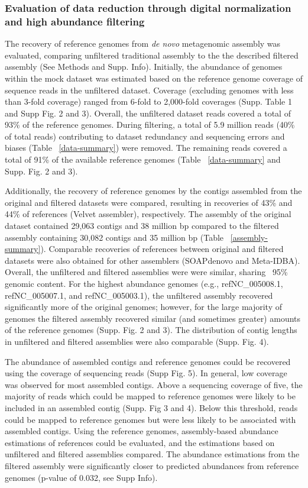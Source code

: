 \documentclass[11pt]{article} %
\begin{document}
\subsubsection{Evaluation of data reduction through digital normalization 
and high abundance filtering}

The recovery of reference genomes from {\em de novo} metagenomic assembly
was evaluated, comparing unfiltered traditional assembly to the the
described filtered assembly (See Methods and Supp. Info). Initially,
the abundance of genomes within the mock dataset was estimated based
on the reference genome coverage of sequence reads in the unfiltered
dataset.  Coverage (excluding genomes with less than 3-fold coverage)
ranged from 6-fold to 2,000-fold coverages (Supp. Table
1 and Supp Fig. 2 and 3).  Overall, the unfiltered dataset reads covered a
total of 93\% of the reference genomes.  During filtering, a total of
5.9 million reads (40\% of total reads) contributing to dataset
redundancy and sequencing errors and biases (Table ~\ref{data-summary}) 
were removed.  The remaining reads covered a total of 91\% of the available 
reference genomes (Table ~\ref{data-summary} and Supp. Fig. 2 and 3).

Additionally, the recovery of reference genomes by the contigs
assembled from the original and filtered datasets were compared,
resulting in recoveries of 43\% and 44\% of references (Velvet
assembler), respectively.  The assembly of the original dataset
contained 29,063 contigs and 38 million bp compared to the filtered
assembly containing 30,082 contigs and 35 million bp (Table
~\ref{assembly-summary}).  Comparable recoveries of references between
original and filtered datasets were also obtained for other assemblers
(SOAPdenovo and Meta-IDBA).  Overall, the unfiltered and filtered
assemblies were were similar, sharing ~95\% genomic content.  For the
highest abundance genomes (e.g., ref\textbar{}NC\_005008.1,
ref\textbar{}NC\_005007.1, and ref\textbar{}NC\_005003.1), the
unfiltered assembly recovered significantly more of the original
genomes; however, for the large majority of genomes the filtered
assembly recovered similar (and sometimes greater) amounts of the
reference genomes (Supp. Fig. 2 and 3).  The distribution of contig
lengths in unfiltered and filtered assemblies were also comparable
(Supp. Fig. 4).

The abundance of assembled contigs and reference genomes could be
recovered using the coverage of sequencing reads (Supp Fig. 5).  In
general, low coverage was observed for most assembled contigs. Above 
a sequencing coverage of five, the majority of reads
which could be mapped to reference genomes were likely to be included
in an assembled contig (Supp. Fig 3 and 4).  Below this threshold,
reads could be mapped to reference genomes but were less likely to be
associated with assembled contigs.  Using the reference genomes,
assembly-based abundance estimations of references could be evaluated,
and the estimations based on unfiltered and filtered assemblies
compared.  The abundance estimations from the filtered assembly were
significantly closer to predicted abundances from reference genomes
(p-value of 0.032, see Supp Info).
\end{document}
